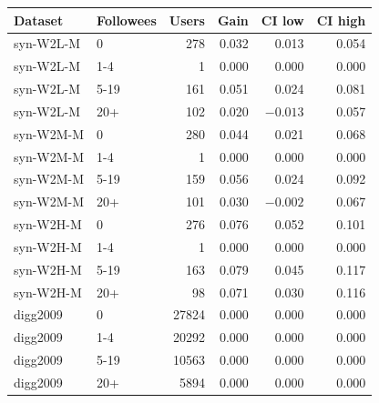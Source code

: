 \begin{tabular}{llrrrr}
\toprule
Dataset & Followees & Users & Gain & CI low & CI high \\
\midrule
syn-W2L-M & 0 & 278 & 0.032 & 0.013 & 0.054 \\
syn-W2L-M & 1-4 & 1 & 0.000 & 0.000 & 0.000 \\
syn-W2L-M & 5-19 & 161 & 0.051 & 0.024 & 0.081 \\
syn-W2L-M & 20+ & 102 & 0.020 & $-0.013$ & 0.057 \\
syn-W2M-M & 0 & 280 & 0.044 & 0.021 & 0.068 \\
syn-W2M-M & 1-4 & 1 & 0.000 & 0.000 & 0.000 \\
syn-W2M-M & 5-19 & 159 & 0.056 & 0.024 & 0.092 \\
syn-W2M-M & 20+ & 101 & 0.030 & $-0.002$ & 0.067 \\
syn-W2H-M & 0 & 276 & 0.076 & 0.052 & 0.101 \\
syn-W2H-M & 1-4 & 1 & 0.000 & 0.000 & 0.000 \\
syn-W2H-M & 5-19 & 163 & 0.079 & 0.045 & 0.117 \\
syn-W2H-M & 20+ & 98 & 0.071 & 0.030 & 0.116 \\
digg2009 & 0 & 27824 & 0.000 & 0.000 & 0.000 \\
digg2009 & 1-4 & 20292 & 0.000 & 0.000 & 0.000 \\
digg2009 & 5-19 & 10563 & 0.000 & 0.000 & 0.000 \\
digg2009 & 20+ & 5894 & 0.000 & 0.000 & 0.000 \\
\bottomrule
\end{tabular}
